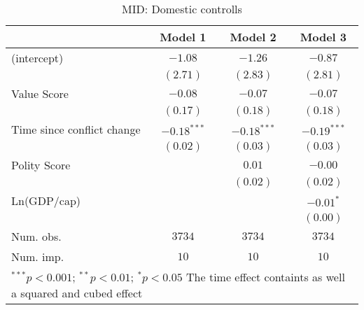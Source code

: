 
\begin{table}
\begin{center}
\begin{tabular}{l c c c}
\toprule
 & Model 1 & Model 2 & Model 3 \\
\midrule
(intercept)                & $-1.08$       & $-1.26$       & $-0.87$       \\
                           & $(2.71)$      & $(2.83)$      & $(2.81)$      \\
Value Score                & $-0.08$       & $-0.07$       & $-0.07$       \\
                           & $(0.17)$      & $(0.18)$      & $(0.18)$      \\
Time since conflict change & $-0.18^{***}$ & $-0.18^{***}$ & $-0.19^{***}$ \\
                           & $(0.02)$      & $(0.03)$      & $(0.03)$      \\
Polity Score               &               & $0.01$        & $-0.00$       \\
                           &               & $(0.02)$      & $(0.02)$      \\
Ln(GDP/cap)                &               &               & $-0.01^{*}$   \\
                           &               &               & $(0.00)$      \\
\midrule
Num. obs.                  & $3734$        & $3734$        & $3734$        \\
Num. imp.                  & $10$          & $10$          & $10$          \\
\bottomrule
\multicolumn{4}{l}{\scriptsize{$^{***}p<0.001$; $^{**}p<0.01$; $^{*}p<0.05$ 
 The time effect containts as well a squared and cubed effect}}
\end{tabular}
\caption{MID: Domestic controlls}
\label{MID_1}
\end{center}
\end{table}
